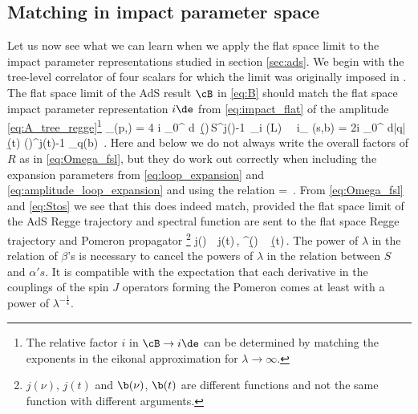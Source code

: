 \subsection{Matching in impact parameter space}
\label{sec:matching_impact_parameter}
Let us now see what we can learn when we apply the flat space limit to the impact parameter representations studied in section \ref{sec:ads}. We begin with the tree-level correlator of four scalars for which the limit was originally imposed in \cite{Cornalba:2007fs}.
The flat space limit of the AdS result $\cB$ in \eqref{eq:B} should match the flat space impact parameter representation $i \de$ from \eqref{eq:impact_flat} of the amplitude \eqref{eq:A_tree_regge}\footnote{The relative factor $i$ in $\cB \to i \de$ can be determined by matching the exponents in the eikonal approximation for $\lambda \to \infty$.}
\beq
\cB_{}(p,\pb) = 4 \pi i \int\limits_{0}^{\oo} d\nu \, \b(\nu)\,S^{j(\nu)-1}\, \Omega_{i\nu} (L)
\ \to \ 
i\de_{} (s,b) = 2i \int\limits_0^{\oo} d|q|\, \b(t) \left(\right)^{j(t)-1} \omega_q(b) \,.
\label{eq:flat_space_limit_dilatons}
\eeq
Here and below we do not always write the overall factors of $R$ as in \eqref{eq:Omega_fsl}, but they do work out correctly when including the expansion parameters from
\eqref{eq:loop_expansion} and \eqref{eq:amplitude_loop_expansion} and using the relation
\beq
{} =  \,.
\eeq
From \eqref{eq:Omega_fsl} and \eqref{eq:Stos} we see that
this does indeed match, provided  the flat space limit of the AdS Regge trajectory and spectral function are sent to the flat space Regge trajectory and Pomeron propagator%
\footnote{$j(\nu)$, $j(t)$ and $\b(\nu)$, $\b(t)$ are different functions and not the same function with different arguments.}
\beq
j(\nu)\, \to\,  j(t)\,, \qquad \lambda^{}\b(\nu)\, \to\,   \,\b(t)\,.
\label{eq:lim_beta}
\eeq
The power of $\lambda$ in the relation of $\beta$'s is necessary to cancel the powers of $\lambda$ in the relation between $S$ and $\alpha' s$.
It is compatible with the expectation that each derivative in the couplings of the spin $J$ operators forming the Pomeron comes at least with a power of $\lambda^{-\frac{1}{4}}$.

